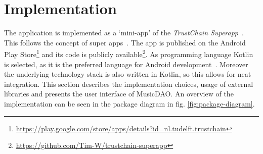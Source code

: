 \chapter{Implementation}
The application is implemented as a `mini-app' of the \textit{TrustChain Superapp}~\citep{mattskala2020}. This follows the concept of super apps~\citep{kpmg2019superapps}. The app is published on the Android Play Store\footnote{\url{https://play.google.com/store/apps/details?id=nl.tudelft.trustchain}} and its code is publicly available\footnote{\url{https://github.com/Tim-W/trustchain-superapp}}. As programming language Kotlin is selected, as it is the preferred language for Android development~\citep{googleio2019}. Moreover the underlying technology stack is also written in Kotlin, so this allows for neat integration. This section describes the implementation choices, usage of external libraries and presents the user interface of MusicDAO. An overview of the implementation can be seen in the package diagram in fig. \ref{fig:package-diagram}.
